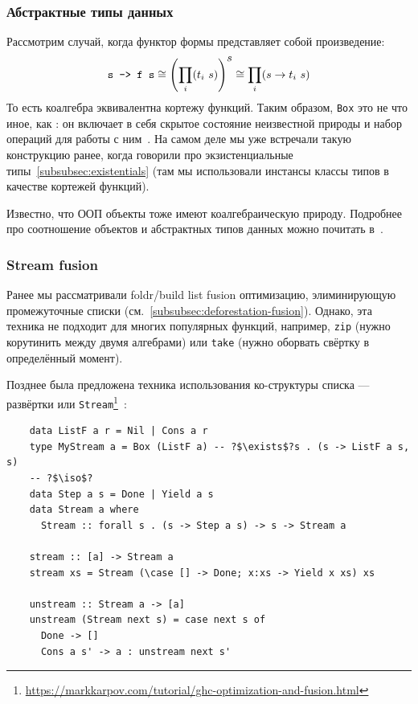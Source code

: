 \subsubsection{Абстрактные типы данных} \label{subsubsec:abstract-data-types}

Рассмотрим случай, когда функтор формы представляет собой произведение:
\[
    \text{\texttt{s -> f s}} \cong \left( \prod_{i}(t_i~ s) \right)^{\displaystyle s} \cong \prod_i(s\to t_i~ s)
\]
То есть коалгебра эквивалентна кортежу функций.
Таким образом, \texttt{Box} это не что иное, как : он включает в себя скрытое состояние неизвестной природы и набор операций для работы с ним~\cite{gibbons2008unfolding}.
На самом деле мы уже встречали такую конструкцию ранее, когда говорили про экзистенциальные типы~\ref{subsubsec:existentials} (там мы использовали инстансы классы типов в качестве кортежей функций).

Известно, что ООП объекты тоже имеют коалгебраическую природу.
Подробнее про соотношение объектов и абстрактных типов данных можно почитать в~\cite{cook2009understanding}.


\subsubsection{Stream fusion} \label{subsubsec:stream-fusion}

Ранее мы рассматривали foldr/build list fusion оптимизацию, элиминирующую промежуточные списки (см.~\ref{subsubsec:deforestation-fusion}).
Однако, эта техника не подходит для многих популярных функций, например, \texttt{zip} (нужно корутинить между двумя алгебрами) или \texttt{take} (нужно оборвать свёртку в определённый момент).

Позднее была предложена техника использования ко-структуры списка --- развёртки или \texttt{Stream}\footnote{\url{https://markkarpov.com/tutorial/ghc-optimization-and-fusion.html}}~\cite{coutts2007stream}:
\begin{verbatim}
    data ListF a r = Nil | Cons a r
    type MyStream a = Box (ListF a) -- ?$\exists$?s . (s -> ListF a s, s)
    -- ?$\iso$?
    data Step a s = Done | Yield a s
    data Stream a where
      Stream :: forall s . (s -> Step a s) -> s -> Stream a

    stream :: [a] -> Stream a
    stream xs = Stream (\case [] -> Done; x:xs -> Yield x xs) xs

    unstream :: Stream a -> [a]
    unstream (Stream next s) = case next s of
      Done -> []
      Cons a s' -> a : unstream next s'
\end{verbatim}

